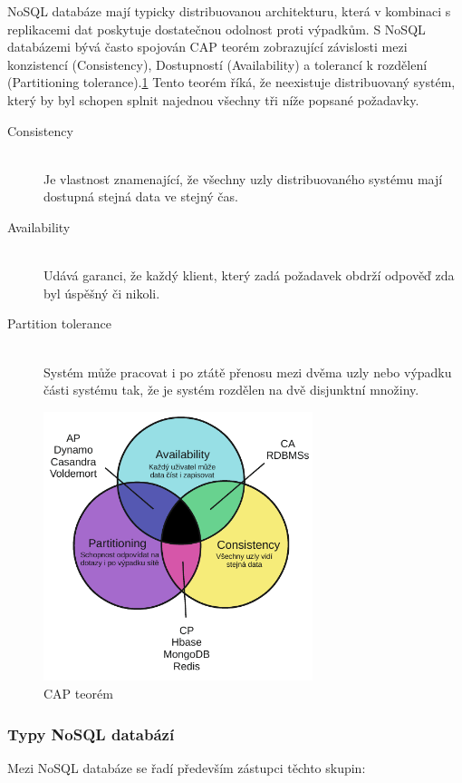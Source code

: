 \documentclass[thesis=M,czech]{FITthesis}[2012/06/26]
\begin{document}
NoSQL databáze mají typicky distribuovanou architekturu, která v kombinaci s replikacemi dat poskytuje dostatečnou odolnost proti výpadkům. S NoSQL databázemi bývá často spojován CAP teorém zobrazující závislosti mezi konzistencí (Consistency), Dostupností (Availability)
a tolerancí k rozdělení (Partitioning tolerance).\ref{fig:cap} Tento teorém říká, že neexistuje distribuovaný systém, který by byl schopen splnit najednou všechny tři níže popsané požadavky.

\begin{description}
	\item[Consistency]\hfill \\
	 Je vlastnost znamenající, že všechny uzly distribuovaného systému mají dostupná stejná data ve stejný čas.
	\item[Availability] \hfill \\
	Udává garanci, že každý klient, který zadá požadavek obdrží odpověď zda byl úspěšný či nikoli.
	\item[Partition tolerance]\hfill \\
	 Systém může pracovat i po ztátě přenosu mezi dvěma uzly nebo výpadku části systému tak, že je systém rozdělen  na dvě disjunktní množiny\cite{cap}.
\end{description}

\begin{figure}[h]\centering 
	\includegraphics[width=0.7\textwidth, angle=0]			{files/cap}
	\caption[CAP teorém]{CAP teorém}\label{fig:cap}
\end{figure}
\pagebreak
\subsubsection{Typy NoSQL databází}
Mezi NoSQL databáze se řadí především zástupci těchto skupin:
\end{document}
